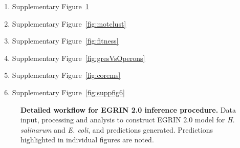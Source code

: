 \begin{enumerate}
\item Supplementary Figure~\ref{fig:workflow}
\item Supplementary Figure~\ref{fig:motclust}
\item Supplementary Figure~\ref{fig:fitness}
\item Supplementary Figure~\ref{fig:gresVsOperons}
\item Supplementary Figure~\ref{fig:corems}
\item Supplementary Figure~\ref{fig:suppfig6}
\end{enumerate}

\begin{figure}[!b]
\centering
{}
\caption{{\bf Detailed workflow for EGRIN 2.0 inference
procedure.} Data input, processing and analysis to construct EGRIN 2.0
model for {\it H. salinarum} and {\it E. coli}, and predictions
generated. Predictions highlighted in individual figures are noted.}
\label{fig:workflow}
\vspace{-.1in}
\end{figure}


